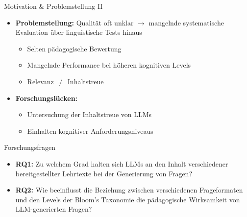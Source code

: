 \documentclass[usenames, dvipsnames, aspectratio=32]{beamer}
\begin{document}
\begin{frame}{Motivation \& Problemstellung II}
    \begin{itemize}
        \item \textbf{Problemstellung:} Qualität oft unklar $\to$ mangelnde systematische Evaluation über linguistische Tests hinaus \cite{horbach_linguistic_2020} 
        \begin{itemize}
            \item Selten pädagogische Bewertung \cite{zhuge_twinstar_2025,blobstein_angel_2023,scaria_how_2024}
            \item Mangelnde Performance bei höheren kognitiven Levels \cite{elkins_how_2023,scaria_how_2024}
            \item Relevanz $\neq$ Inhaltstreue \cite{elkins_how_2023,hang_mcqgen_2024,mi_comparative_2024}
        \end{itemize}
        \vspace{.5em}
        \item \textbf{Forschungslücken:}
        \begin{itemize}
            \item Untersuchung der Inhaltstreue von LLMs
            \item Einhalten kognitiver Anforderungsniveaus
        \end{itemize}
    \end{itemize}
\end{frame}

\begin{frame}{Forschungsfragen}
    \begin{itemize}
        \item \textbf{RQ1:} Zu welchem Grad \textcolor{RedOrange!60}{halten sich LLMs} an den Inhalt verschiedener bereitgestellter \textcolor{RedOrange!60}{Lehrtexte} bei der Generierung von Fragen? \vspace{.5em}
        \item \textbf{RQ2:} Wie beeinflusst die \textcolor{RedOrange!60}{Beziehung} zwischen verschiedenen Frageformaten und den Levels der Bloom's Taxonomie die \textcolor{RedOrange!60}{pädagogische Wirksamkeit} von LLM-generierten Fragen?
    \end{itemize}
\end{frame}
\end{document}
